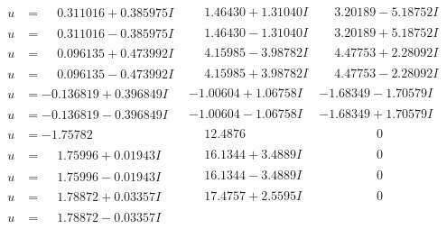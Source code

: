 \documentclass[1p]{elsarticle_modified}
\theoremstyle{definition}
\begin{document}
$$\begin{array}{c|c|c}
\begin{aligned}
u &= \phantom{-}0.311016 + 0.385975 I\end{aligned}
 & \phantom{-}1.46430 + 1.31040 I & \phantom{-}3.20189 - 5.18752 I \\ \hline\begin{aligned}
u &= \phantom{-}0.311016 - 0.385975 I\end{aligned}
 & \phantom{-}1.46430 - 1.31040 I & \phantom{-}3.20189 + 5.18752 I \\ \hline\begin{aligned}
u &= \phantom{-}0.096135 + 0.473992 I\end{aligned}
 & \phantom{-}4.15985 - 3.98782 I & \phantom{-}4.47753 + 2.28092 I \\ \hline\begin{aligned}
u &= \phantom{-}0.096135 - 0.473992 I\end{aligned}
 & \phantom{-}4.15985 + 3.98782 I & \phantom{-}4.47753 - 2.28092 I \\ \hline\begin{aligned}
u &= -0.136819 + 0.396849 I\end{aligned}
 & -1.00604 + 1.06758 I & -1.68349 - 1.70579 I \\ \hline\begin{aligned}
u &= -0.136819 - 0.396849 I\end{aligned}
 & -1.00604 - 1.06758 I & -1.68349 + 1.70579 I \\ \hline\begin{aligned}
u &= -1.75782\phantom{ +0.000000I}\end{aligned}
 & \phantom{-}12.4876\phantom{ +0.000000I} & \phantom{-0.000000 } 0 \\ \hline\begin{aligned}
u &= \phantom{-}1.75996 + 0.01943 I\end{aligned}
 & \phantom{-}16.1344 + 3.4889 I & \phantom{-0.000000 } 0 \\ \hline\begin{aligned}
u &= \phantom{-}1.75996 - 0.01943 I\end{aligned}
 & \phantom{-}16.1344 - 3.4889 I & \phantom{-0.000000 } 0 \\ \hline\begin{aligned}
u &= \phantom{-}1.78872 + 0.03357 I\end{aligned}
 & \phantom{-}17.4757 + 2.5595 I & \phantom{-0.000000 } 0 \\ \hline\begin{aligned}
u &= \phantom{-}1.78872 - 0.03357 I\end{aligned}

\end{array}$$
\end{document}

